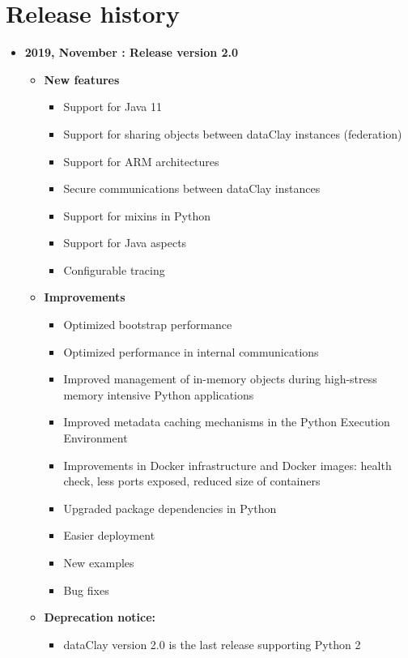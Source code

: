 \chapter*{Release history}

\begin{itemize}
\item[] \textbf{2019, November : Release version 2.0}\newline
    \begin{itemize}
    \item[] \textbf{New features}
        \begin{itemize}
            \item[] Support for Java 11
            \item[] Support for sharing objects between dataClay instances (federation)
            \item[] Support for ARM architectures
            \item[] Secure communications between dataClay instances
            \item[] Support for mixins in Python
            \item[] Support for Java aspects
            \item[] Configurable tracing
        \end{itemize}
    \item[] \textbf{Improvements}
        \begin{itemize}
            \item[] Optimized bootstrap performance
            \item[] Optimized performance in internal communications
            \item[] Improved management of in-memory objects during high-stress memory intensive Python applications
            \item[] Improved metadata caching mechanisms in the Python Execution Environment
            \item[] Improvements in Docker infrastructure and Docker images: health check, less ports exposed, reduced size of containers 
            \item[] Upgraded package dependencies in Python
            \item[] Easier deployment
            \item[] New examples
            \item[] Bug fixes
        \end{itemize}
    \item[] \textbf{Deprecation notice:}
        \begin{itemize}
            \item[] dataClay version 2.0 is the last release supporting Python 2
        \end{itemize}
    \end{itemize}
\end{itemize}
